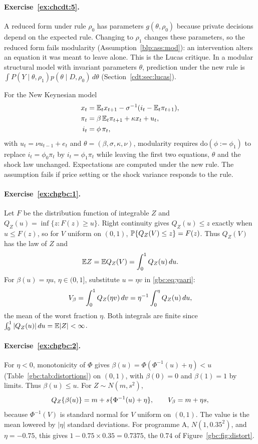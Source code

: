 \paragraph{Exercise~\ref{ex:chcdt:5}.} A reduced form under rule $\rho_0$ has parameters $g(\theta,\rho_0)$ because private decisions depend on the expected rule. Changing to $\rho_1$ changes these parameters, so the reduced form fails modularity (Assumption~\ref{blp:ass:mod}): an intervention alters an equation it was meant to leave alone. This is the Lucas critique. In a modular structural model with invariant parameters $\theta$, prediction under the new rule is $\int P(Y\mid\theta,\rho_1)p(\theta\mid D,\rho_0)\,d\theta$ (Section~\ref{cdt:sec:lucas}).

For the New Keynesian model
\[
\begin{aligned}
x_t &= \mathbb{E}_t x_{t+1} - \sigma^{-1}(i_t - \mathbb{E}_t\pi_{t+1}),\\
\pi_t &= \beta\,\mathbb{E}_t\pi_{t+1} + \kappa x_t + u_t,\\
i_t &= \phi\,\pi_t,
\end{aligned}
\]
with $u_t = \nu u_{t-1} + e_t$ and $\theta = (\beta,\sigma,\kappa,\nu)$, modularity requires $\mathrm{do}(\phi:=\phi_1)$ to replace $i_t = \phi_0\pi_t$ by $i_t = \phi_1\pi_t$ while leaving the first two equations, $\theta$ and the shock law unchanged. Expectations are computed under the new rule. The assumption fails if price setting or the shock variance responds to the rule.

\paragraph{Exercise~\ref{ex:chgbc:1}.} Let $F$ be the distribution function of integrable $Z$ and $Q_Z(u) = \inf\{z : F(z) \ge u\}$. Right continuity gives $Q_Z(u) \le z$ exactly when $u \le F(z)$, so for $V$ uniform on $(0,1)$, $\mathbb{P}\{Q_Z(V) \le z\} = F(z)$. Thus $Q_Z(V)$ has the law of $Z$ and
\[
\mathbb{E} Z = \mathbb{E} Q_Z(V) = \int_0^1 Q_Z(u)\,du.
\]
For $\beta(u) = \eta u$, $\eta \in (0,1]$, substitute $u = \eta v$ in \eqref{gbc:eq:yaari}:
\[
V_{\beta} = \int_0^1 Q_Z(\eta v)\,dv = \eta^{-1}\int_0^\eta Q_Z(u)\,du,
\]
the mean of the worst fraction $\eta$. Both integrals are finite since $\int_0^1 |Q_Z(u)|\,du = \mathbb{E}|Z| < \infty$.

\paragraph{Exercise~\ref{ex:chgbc:2}.} For $\eta < 0$, monotonicity of $\Phi$ gives $\beta(u) = \Phi(\Phi^{-1}(u) + \eta) < u$ (Table~\ref{gbc:tab:distortions}) on $(0,1)$, with $\beta(0) = 0$ and $\beta(1) = 1$ by limits. Thus $\beta(u) \le u$. For $Z \sim N(m,s^2)$,
\[
Q_Z\{\beta(u)\} = m + s\{\Phi^{-1}(u) + \eta\},
\qquad
V_{\beta} = m + \eta s,
\]
because $\Phi^{-1}(V)$ is standard normal for $V$ uniform on $(0,1)$. The value is the mean lowered by $|\eta|$ standard deviations. For programme A, $N(1,0.35^2)$, and $\eta = -0.75$, this gives $1 - 0.75\times0.35 = 0.7375$, the $0.74$ of Figure~\ref{gbc:fig:distort}.

